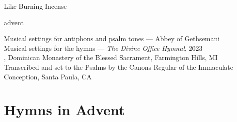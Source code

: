 \documentclass{lbi_cantor_letter}
\begin{document}
\pagestyle{empty}
\onecolumn

\null\vfill
\begin{center}
  \huge Like Burning Incense

  \bigskip\LARGE advent

  \vfill\vfill\null

\end{center}


\newpage

\null\vfill
\begin{center}
  \vfill\small
  Musical settings for antiphons and psalm tones --- Abbey of Gethsemani\\
  Musical settings for the hymns --- \emph{The Divine Office Hymnal}, 2023\\
  , Dominican Monastery of the Blessed Sacrament, Farmington Hills, MI\\
  Transcribed and set to the Psalms by the Canons Regular of the Immaculate Conception, Santa Paula, CA
\end{center}

\newpage

\begin{KeepFromToc}
  \tableofcontents
\end{KeepFromToc}

\restoregeometry
\pagestyle{fancy}


\twocolumn


\chapter{Hymns in Advent}



\end{document}
